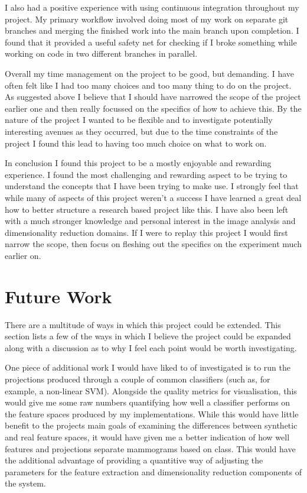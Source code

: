 I also had a positive experience with using continuous integration throughout my project. My primary workflow involved doing most of my work on separate git branches and merging the finished work into the main branch upon completion. I found that it provided a useful safety net for checking if I broke something while working on code in two different branches in parallel.

Overall my time management on the project to be good, but demanding. I have often felt like I had too many choices and too many thing to do on the project. As suggested above I believe that I should have narrowed the scope of the project earlier one and then really focussed on the specifics of how to achieve this. By the nature of the project I wanted to be flexible and to investigate potentially interesting avenues as they occurred, but due to the time constraints of the project I found this lead to having too much choice on what to work on.

In conclusion I found this project to be a mostly enjoyable and rewarding experience. I found the most challenging and rewarding aspect to be trying to understand the concepts that I have been trying to make use. I strongly feel that while many of aspects of this project weren't a success I have learned a great deal how to better structure a research based project like this. I have also been left with a much stronger knowledge and personal interest in the image analysis and dimensionality reduction domains. If I were to replay this project I would first narrow the scope, then focus on fleshing out the specifics on the experiment much earlier on.  


\section{Future Work}
\label{sec:future-work}
There are a multitude of ways in which this project could be extended. This section lists a few of the ways in which I believe the project could be expanded along with a discussion as to why I feel each point would be worth investigating.

One piece of additional work I would have liked to of investigated is to run the projections produced through a couple of common classifiers (such as, for example, a non-linear SVM). Alongside the quality metrics for visualisation, this would give me some raw numbers quantifying how well a classifier performs on the feature spaces produced by my implementations. While this would have little benefit to the projects main goals of examining the differences between synthetic and real feature spaces, it would have given me a better indication of how well features and projections separate mammograms based on class. This would have the additional advantage of providing a quantitive way of adjusting the parameters for the feature extraction and dimensionality reduction components of the system.

